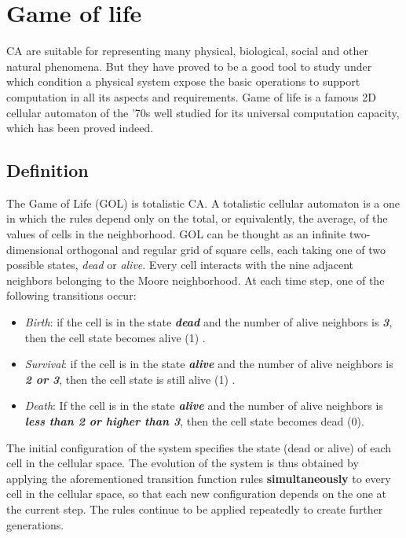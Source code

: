 \section{Game of life}
\label{sect:GOL}
CA are suitable for representing many physical, biological, social and other
natural phenomena.
But they have proved to be a good tool to study under which condition a
physical system expose the basic operations 
to  support computation in all its aspects and requirements. Game of life is a famous 2D
cellular automaton of the '70s well studied for its universal
computation capacity, which has been proved indeed.

\subsection{Definition} 
The Game of Life (GOL) is totalistic CA.
A totalistic cellular automaton is a one in which the rules depend only on the total, or equivalently, the average, of the values of cells in the neighborhood. 
GOL can be thought as an infinite two-dimensional orthogonal and regular grid of square cells, each taking one of two possible states, \emph{dead} or \emph{alive}.
Every cell interacts with the nine adjacent neighbors belonging to the Moore neighborhood. At each time step, one of the following transitions occur:
	\begin{itemize}
	\item \emph{Birth}: if the cell is in the state \textbf{\textit{dead}} and
	the number of alive neighbors is \textbf{\textit{3}}, then the cell state
	becomes alive (1) .
	\item \emph{Survival}: if the cell is in the state \textbf{\textit{alive}}
	and the number of alive neighbors is \textbf{\textit{2 or 3}}, then the cell
	state is still alive (1) .
	\item \emph{Death}: If the cell is in the state \textbf{\textit{alive}} and
	the number of alive neighbors is \textbf{\textit{less than 2 or higher
			than 3}}, then the cell state becomes dead (0).
\end{itemize}
The initial configuration of the system specifies the state (dead
or alive) of each cell in the cellular space. The evolution of the
system is thus obtained by applying the aforementioned transition function rules \textbf{simultaneously} to every cell in
the cellular space, so that each new configuration depends on the
one at the current step. The rules continue to be applied
repeatedly to create further generations.

